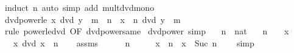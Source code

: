 \begin{isabellebody}
%
\isatagproof
{}\isamarkupfalse%
\ {\isacharparenleft}{\kern0pt}induct\ n{\isacharparenright}{\kern0pt}\ {\isacharparenleft}{\kern0pt}auto\ simp\ add{\isacharcolon}{\kern0pt}\ mult{\isacharunderscore}{\kern0pt}dvd{\isacharunderscore}{\kern0pt}mono{\isacharparenright}{\kern0pt}%
\endisatagproof
{\isafoldproof}%
%
\isadelimproof
\isanewline
%
\endisadelimproof
\isanewline
{}\isamarkupfalse%
\ dvd{\isacharunderscore}{\kern0pt}power{\isacharunderscore}{\kern0pt}le{\isacharcolon}{\kern0pt}\ {\isachardoublequoteopen}x\ dvd\ y\ {\isasymLongrightarrow}\ m\ {\isasymge}\ n\ {\isasymLongrightarrow}\ x\ {\isacharcircum}{\kern0pt}\ n\ dvd\ y\ {\isacharcircum}{\kern0pt}\ m{\isachardoublequoteclose}\isanewline
%
\isadelimproof
\ \ %
\endisadelimproof
%
\isatagproof
{}\isamarkupfalse%
\ {\isacharparenleft}{\kern0pt}rule\ power{\isacharunderscore}{\kern0pt}le{\isacharunderscore}{\kern0pt}dvd\ {\isacharbrackleft}{\kern0pt}OF\ dvd{\isacharunderscore}{\kern0pt}power{\isacharunderscore}{\kern0pt}same{\isacharbrackright}{\kern0pt}{\isacharparenright}{\kern0pt}%
\endisatagproof
{\isafoldproof}%
%
\isadelimproof
\isanewline
%
\endisadelimproof
\isanewline
{}\isamarkupfalse%
\ dvd{\isacharunderscore}{\kern0pt}power\ {\isacharbrackleft}{\kern0pt}simp{\isacharbrackright}{\kern0pt}{\isacharcolon}{\kern0pt}\isanewline
\ \ \ n\ {\isacharcolon}{\kern0pt}{\isacharcolon}{\kern0pt}\ nat\isanewline
\ \ \ {\isachardoublequoteopen}n\ {\isachargreater}{\kern0pt}\ {}\ {\isasymor}\ x\ {\isacharequal}{\kern0pt}\ {}{\isachardoublequoteclose}\isanewline
\ \ \ {\isachardoublequoteopen}x\ dvd\ {\isacharparenleft}{\kern0pt}x\ {\isacharcircum}{\kern0pt}\ n{\isacharparenright}{\kern0pt}{\isachardoublequoteclose}\isanewline
%
\isadelimproof
\ \ %
\endisadelimproof
%
\isatagproof
{}\isamarkupfalse%
\ assms\isanewline
{}\isamarkupfalse%
\isanewline
\ \ \isamarkupfalse%
\ {\isachardoublequoteopen}{}\ {\isacharless}{\kern0pt}\ n{\isachardoublequoteclose}\isanewline
\ \ \isamarkupfalse%
\ \isamarkupfalse%
\ {\isachardoublequoteopen}x\ {\isacharcircum}{\kern0pt}\ n\ {\isacharequal}{\kern0pt}\ x\ {\isacharcircum}{\kern0pt}\ Suc\ {\isacharparenleft}{\kern0pt}n\ {\isacharminus}{\kern0pt}\ {}{\isacharparenright}{\kern0pt}{\isachardoublequoteclose}\ \isamarkupfalse%
\ simp\isanewline
\ \ \isamarkupfalse%
\ \isamarkupfalse%

\end{isabellebody}
